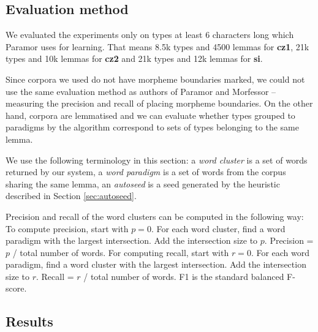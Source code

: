 \documentclass{itatnew}
\newcommand{\e}[1]{\textit{#1}} %
\begin{document}
\subsection{Evaluation method}

\noindent
We evaluated the experiments only on types at least 6 characters long which Paramor uses for learning. That means 8.5k types and 4500 lemmas for \textbf{cz1}, 21k types and 10k lemmas for \textbf{cz2} and 21k types and 12k lemmas for \textbf{si}.

Since corpora we used do not have morpheme boundaries marked, we could not use the same evaluation method as authors of Paramor and Morfessor -- measuring the precision and recall of placing morpheme boundaries. On the other hand, corpora are lemmatised and we can evaluate whether types grouped to paradigms by the algorithm correspond to sets of types belonging to the same lemma.

We use the following terminology in this section: a \e{word cluster} is a set of words returned by our system, a \e{word paradigm} is a set of words from the corpus sharing the same lemma, an \e{autoseed} is a seed generated by the heuristic described in Section \ref{sec:autoseed}.

%
Precision and recall of the word clusters can be computed in the following way: To compute precision, start with $p = 0$. For each word cluster, find a word paradigm with the largest intersection. Add the intersection size to $p$. Precision = $p$ / total number of words. For computing recall, start with $r = 0$. For each word paradigm, find a word cluster with the largest intersection. Add the intersection size to $r$. Recall = $r$ / total number of words. F1 is the standard balanced F-score.

\subsection{Results}
\end{document}
